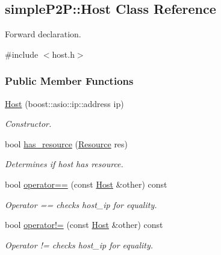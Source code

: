 \hypertarget{classsimpleP2P_1_1Host}{}\subsection{simple\+P2P\+:\+:Host Class Reference}
\label{classsimpleP2P_1_1Host}


Forward declaration.  




{\ttfamily \#include $<$host.\+h$>$}

\subsubsection*{Public Member Functions}
\begin{DoxyCompactItemize}
\item 
\hyperlink{classsimpleP2P_1_1Host_abbe0b5c51195b8cf2019d791ace5a5c7}{Host} (boost\+::asio\+::ip\+::address ip)
\begin{DoxyCompactList}\small\item\em Constructor. \end{DoxyCompactList}\item 
bool \hyperlink{classsimpleP2P_1_1Host_a5d4b48eaf05f5353816aae78cbd29c64}{has\+\_\+resource} (\hyperlink{classsimpleP2P_1_1Resource}{Resource} res)
\begin{DoxyCompactList}\small\item\em Determines if host has resource. \end{DoxyCompactList}\item 
bool \hyperlink{classsimpleP2P_1_1Host_aadac09c6ab516f62e5eebe28dd584626}{operator==} (const \hyperlink{classsimpleP2P_1_1Host}{Host} \&other) const
\begin{DoxyCompactList}\small\item\em Operator == checks host\+\_\+ip for equality. \end{DoxyCompactList}\item 
bool \hyperlink{classsimpleP2P_1_1Host_a13516e95bf59bb8dd6eea8940f8bb677}{operator!=} (const \hyperlink{classsimpleP2P_1_1Host}{Host} \&other) const
\begin{DoxyCompactList}\small\item\em Operator != checks host\+\_\+ip for equality. \end{DoxyCompactList}\end{DoxyCompactItemize}
